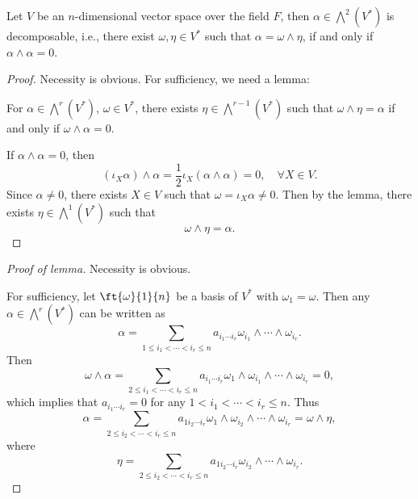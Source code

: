     \begin{problem}
        Let $V$ be an $n$-dimensional vector space over the field $F$, 
        then $\alpha\in\bigwedge^2(V^*)$ is decomposable, 
        i.e., there exist $\omega,\eta\in V^*$ 
        such that $\alpha=\omega\wedge\eta$, 
        if and only if $\alpha\wedge\alpha=0$.
    \end{problem}
    \begin{proof}
        Necessity is obvious. For sufficiency, we need a lemma:
        \begin{lemma}
            For $\alpha\in\bigwedge^r(V^*)$, $\omega\in V^*$,
            there exists $\eta\in\bigwedge^{r-1}(V^*)$ such that
            $\omega\wedge\eta=\alpha$ if and only if
            $\omega\wedge\alpha=0$.
        \end{lemma}
        If $\alpha\wedge\alpha=0$, 
        then 
        \[
            (\iota_X\alpha)\wedge\alpha 
            =\frac{1}{2}\iota_X(\alpha\wedge\alpha)=0,
            \quad\forall X\in V.
        \]
        Since $\alpha\neq0$, there exists $X\in V$ such that
        $\omega=\iota_X\alpha\neq0$. Then by the lemma, there exists
        $\eta\in\bigwedge^{1}(V^*)$ such that
        \[
            \omega\wedge\eta=\alpha.
        \]
    \end{proof}
    \begin{proof}[\indent Proof of lemma]
        Necessity is obvious.
        
        For sufficiency, let $\ft{\omega}{1}{n}$ be a basis of $V^*$
        with $\omega_1=\omega$.
        Then any $\alpha\in\bigwedge^r(V^*)$ can be written as 
        \[
            \alpha=\sum_{1\leqslant i_1<\cdots<i_r\leqslant n}
            a_{i_1\cdots i_r}\omega_{i_1}\wedge\cdots\wedge\omega_{i_r}.
        \]
        Then 
        \[
            \omega\wedge\alpha
            =\sum_{2\leqslant i_1<\cdots<i_r\leqslant n}
            a_{i_1\cdots i_r}\omega_1\wedge\omega_{i_1}\wedge\cdots\wedge\omega_{i_r}
            = 0,
        \]
        which implies that $a_{i_1\cdots i_r}=0$ for any
        $1<i_1<\cdots<i_r\leqslant n$. Thus
        \[
            \alpha
            =\sum_{2\leqslant i_2<\cdots<i_r\leqslant n}
            a_{1 i_2\cdots i_r}
            \omega_1\wedge\omega_{i_2}\wedge\cdots\wedge\omega_{i_r}
            = \omega\wedge\eta,
        \]
        where 
        \[
            \eta
            =\sum_{2\leqslant i_2<\cdots<i_r\leqslant n}
            a_{1 i_2\cdots i_r}
            \omega_{i_2}\wedge\cdots\wedge\omega_{i_r}.
        \]
    \end{proof}